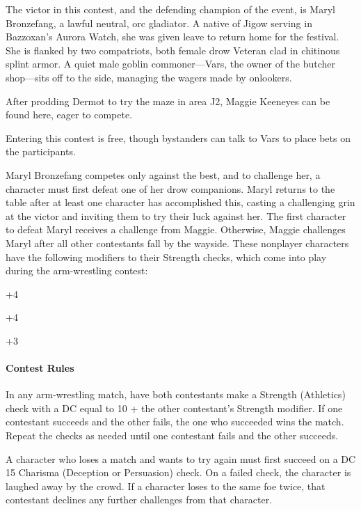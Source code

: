 \documentclass[10pt,a4paper,twoside,twocolumn,openany,nodeprecatedcode]{dndbook}
\begin{document}
The victor in this contest, and the defending champion of the event, is Maryl Bronzefang, a lawful neutral, orc gladiator. A native of Jigow serving in Bazzoxan's Aurora Watch, she was given leave to return home for the festival. She is flanked by two compatriots, both female drow Veteran clad in chitinous splint armor. A quiet male goblin commoner—Vars, the owner of the butcher shop—sits off to the side, managing the wagers made by onlookers.

After prodding Dermot to try the maze in area J2, Maggie Keeneyes can be found here, eager to compete.

Entering this contest is free, though bystanders can talk to Vars to place bets on the participants.

Maryl Bronzefang competes only against the best, and to challenge her, a character must first defeat one of her drow companions. Maryl returns to the table after at least one character has accomplished this, casting a challenging grin at the victor and inviting them to try their luck against her. The first character to defeat Maryl receives a challenge from Maggie. Otherwise, Maggie challenges Maryl after all other contestants fall by the wayside. These nonplayer characters have the following modifiers to their Strength checks, which come into play during the arm-wrestling contest:


\begin{description}[nolistsep]
\item[Maggie Keeneyes:]
+4
\item[Maryl Bronzefang:]
+4
\item[Female Drow:]
+3
\end{description}

\paragraph{Contest Rules}
In any arm-wrestling match, have both contestants make a Strength (Athletics) check with a DC equal to 10 + the other contestant's Strength modifier. If one contestant succeeds and the other fails, the one who succeeded wins the match. Repeat the checks as needed until one contestant fails and the other succeeds.

A character who loses a match and wants to try again must first succeed on a DC 15 Charisma (Deception or Persuasion) check. On a failed check, the character is laughed away by the crowd. If a character loses to the same foe twice, that contestant declines any further challenges from that character.
\end{document}
